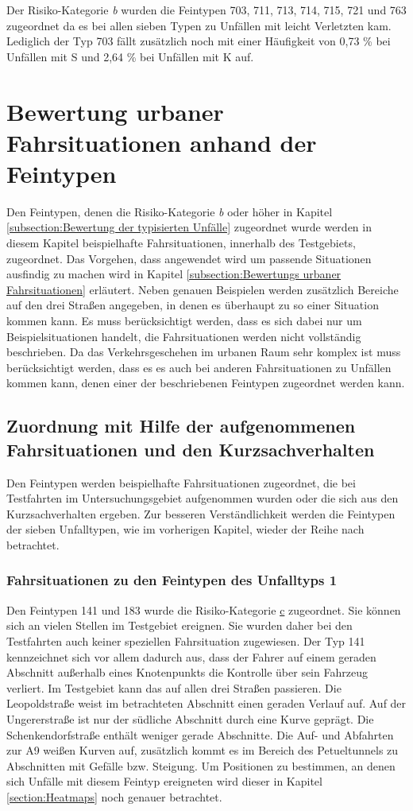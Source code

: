 Der Risiko-Kategorie \textit{b} wurden die Feintypen 703, 711, 713, 714, 715, 721 und 763 zugeordnet da es bei allen sieben Typen zu Unfällen mit leicht Verletzten kam. Lediglich der Typ 703 fällt zusätzlich noch mit einer Häufigkeit von 0,73 \% bei Unfällen mit \ac{S} und 2,64 \% bei Unfällen mit \ac{K} auf.

\section{Bewertung urbaner Fahrsituationen anhand der Feintypen}\label{section:Zuordnung der Unfälle zu Fahrsituationen}
Den Feintypen, denen die Risiko-Kategorie \textit{b} oder höher in Kapitel \ref{subsection:Bewertung der typisierten Unfälle} zugeordnet wurde werden in diesem Kapitel beispielhafte Fahrsituationen, innerhalb des Testgebiets, zugeordnet. Das Vorgehen, dass angewendet wird um passende Situationen ausfindig zu machen wird in Kapitel \ref{subsection:Bewertungs urbaner Fahrsituationen} erläutert. Neben genauen Beispielen werden zusätzlich Bereiche auf den drei Straßen angegeben, in denen es überhaupt zu so einer Situation kommen kann. Es muss berücksichtigt werden, dass es sich dabei nur um Beispielsituationen handelt, die Fahrsituationen werden nicht vollständig beschrieben. Da das Verkehrsgeschehen im urbanen Raum sehr komplex ist muss berücksichtigt werden, dass es es auch bei anderen Fahrsituationen zu Unfällen kommen kann, denen einer der beschriebenen Feintypen zugeordnet werden kann.

\subsection{Zuordnung mit Hilfe der aufgenommenen Fahrsituationen und den Kurzsachverhalten}
Den Feintypen werden beispielhafte Fahrsituationen zugeordnet, die bei Testfahrten im Untersuchungsgebiet aufgenommen wurden oder die sich aus den Kurzsachverhalten ergeben. Zur besseren Verständlichkeit werden die Feintypen der sieben Unfalltypen, wie im vorherigen Kapitel, wieder der Reihe nach betrachtet.

\subsubsection{Fahrsituationen zu den Feintypen des Unfalltyps 1}
Den Feintypen 141 und 183 wurde die Risiko-Kategorie \underline{c} zugeordnet. Sie können sich an vielen Stellen im Testgebiet ereignen. Sie wurden daher bei den Testfahrten auch keiner speziellen Fahrsituation zugewiesen. Der Typ 141 kennzeichnet sich vor allem dadurch aus, dass der Fahrer auf einem geraden Abschnitt außerhalb eines Knotenpunkts die Kontrolle über sein Fahrzeug verliert. Im Testgebiet kann das auf allen drei Straßen passieren. Die Leopoldstraße weist im betrachteten Abschnitt einen geraden Verlauf auf. Auf der Ungererstraße ist nur der südliche Abschnitt durch eine Kurve geprägt. Die Schenkendorfstraße enthält weniger gerade Abschnitte. Die Auf- und Abfahrten zur A9 weißen Kurven auf, zusätzlich kommt es im Bereich des Petueltunnels zu Abschnitten mit Gefälle bzw. Steigung. Um Positionen zu bestimmen, an denen sich Unfälle mit diesem Feintyp ereigneten wird dieser in Kapitel \ref{section:Heatmaps} noch genauer betrachtet.

